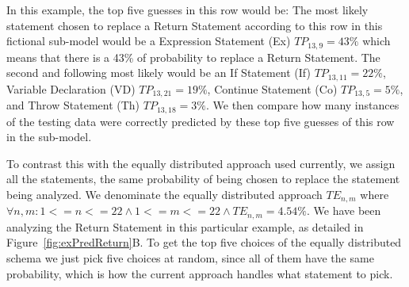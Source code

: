 \documentclass[conference]{IEEEtran}
\begin{document}
In this example, the top five guesses in this row would be: The most 
likely statement chosen to replace a Return Statement according to this row in 
this fictional sub-model would be a Expression Statement (Ex) $TP_{13,9} = 43\%$ 
which means that there is a 43\% of probability to replace a Return Statement. 
The second and following most likely would be an If Statement (If) $TP_{13,11} = 22\%$, Variable Declaration (VD)  $TP_{13,21} = 19\%$, 
Continue Statement (Co)  $TP_{13,5} = 5\%$, and Throw Statement (Th) $TP_{13,18} = 3\%$. We then compare how many instances of the testing data were correctly predicted 
by these top five guesses of this row in the sub-model. 


To contrast this with the equally distributed approach used currently, 
we assign all the statements, the same probability of being chosen to replace 
the statement being analyzed. We denominate the equally distributed approach 
$TE_{n,m}$ where $\forall n,m: 1<=n<=22 \land 1<=m<=22 \land TE_{n,m} = 4.54\%$. 
We have been analyzing the Return Statement in this particular example, as 
detailed in Figure~\ref{fig:exPredReturn}B. To get the top five choices of the 
equally distributed schema we just pick five choices at random, since all of 
them have the same probability, which is how the current approach handles what 
statement to pick.

\end{document}
